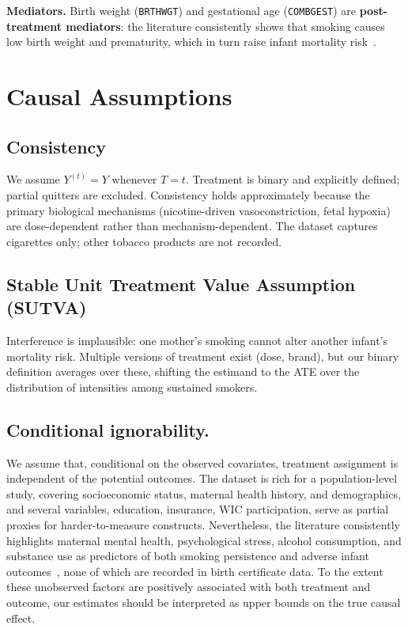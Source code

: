 \documentclass[11pt]{article}
\begin{document}
\vspace{1em}
\textbf{Mediators.} Birth weight (\texttt{BRTHWGT}) and gestational age
(\texttt{COMBGEST}) are \textbf{post-treatment mediators}: the literature
consistently shows that smoking causes low birth weight and prematurity,
which in turn raise infant mortality risk~\cite{dietz2010, cnattingius2004}.




\section{Causal Assumptions}

\subsection{Consistency}
We assume $Y^{(t)} = Y$ whenever $T = t$. Treatment is binary and explicitly defined; partial quitters are excluded. Consistency holds approximately because the primary biological mechanisms (nicotine-driven vasoconstriction, fetal hypoxia) are dose-dependent rather than mechanism-dependent. The dataset captures cigarettes only; other tobacco products are not recorded.

\subsection{Stable Unit Treatment Value Assumption (SUTVA)}
Interference is implausible: one mother's smoking cannot alter another infant's mortality risk. Multiple versions of treatment exist (dose, brand), but our binary definition averages over these, shifting the estimand to the ATE over the distribution of intensities among sustained smokers.

\subsection{Conditional ignorability.} We assume that, conditional on the
observed covariates, treatment assignment is independent of the potential
outcomes. The dataset is rich for a population-level study,
covering socioeconomic status, maternal health history, and demographics,
and several variables, education, insurance, WIC participation, serve
as partial proxies for harder-to-measure constructs. Nevertheless, the
literature consistently highlights maternal mental health, psychological
stress, alcohol consumption, and substance use as predictors of both
smoking persistence and adverse infant outcomes~\cite{cnattingius2004,
richmond2017}, none of which are recorded in birth certificate data.
To the extent these unobserved factors are positively associated with
both treatment and outcome, our estimates should be interpreted as upper
bounds on the true causal effect.
\end{document}
